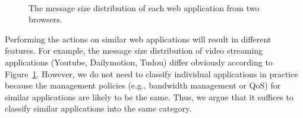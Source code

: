 \documentclass[preprint,12pt]{elsarticle}
\begin{document}
\begin{figure}[H]
\centering
{}\\
\caption{The message size distribution of each web application from two browsers.}
\label{Fig.msg_size_distribution}
\end{figure}

Performing the actions on similar web applications will result in different features. For example, the message size distribution of video streaming applications (Youtube, Dailymotion, Tudou) differ obviously according to Figure~\ref{Fig.msg_size_distribution}. However, we do not need to classify individual applications in practice because the management policies (e.g., bandwidth management or QoS) for similar applications are likely to be the same. Thus, we argue that it suffices to classify similar applications into the same category.
\end{document}
